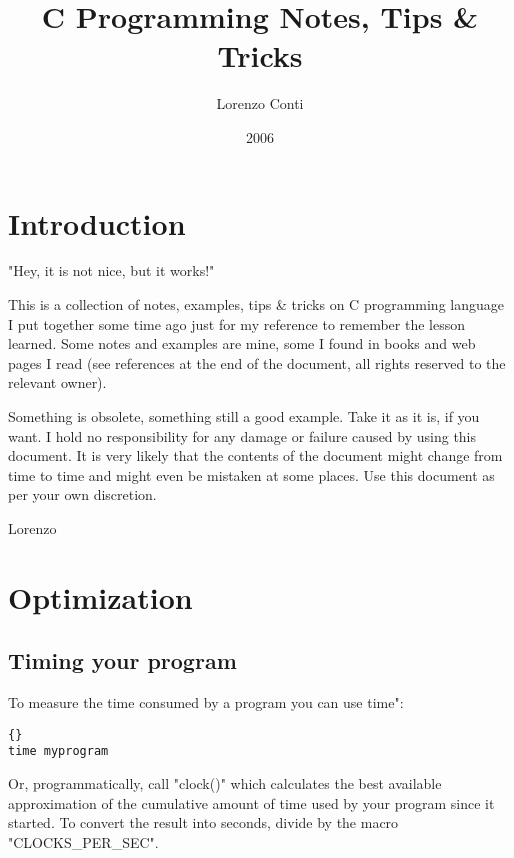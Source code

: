 \documentclass{report}
\begin{document}
\title{C Programming Notes, Tips \& Tricks}
\author{Lorenzo Conti}
\date{2006}

\maketitle
\tableofcontents


\chapter{Introduction}


"Hey, it is not nice, but it works!"


This is a collection of notes, examples, tips \& tricks on C programming language I put together some time ago just for my reference to remember the lesson learned.
Some notes and examples are mine, some I found in books and web pages I read (see references at the end of the document, all rights reserved to the relevant owner). 

Something is obsolete, something still a good example.
Take it as it is, if you want.
I hold no responsibility for any damage or failure caused by using this document. It is very likely that the contents of the document might change from time to time and might even be mistaken at some places. Use this document as per your own discretion.

Lorenzo

\chapter{Optimization}

\section{Timing your program}
To measure the time consumed by a program you can use time":
\begin{lstlisting}{}
time myprogram
\end{lstlisting}
Or, programmatically, call "clock()" which calculates the best available approximation of the cumulative amount of time used by your program since it started. To convert the result into seconds, divide by the macro "CLOCKS\_PER\_SEC".
\end{document}
